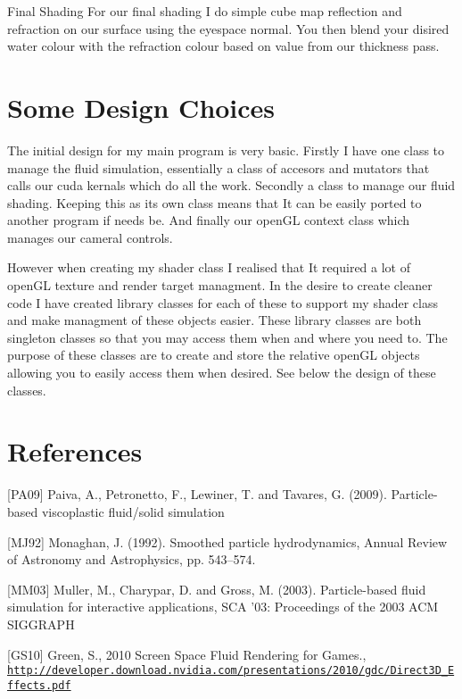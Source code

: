 \begin{DoxyEnumerate}
\item Final Shading For our final shading I do simple cube map reflection and refraction on our surface using the eyespace normal. You then blend your disired water colour with the refraction colour based on value from our thickness pass.\par
  
\end{DoxyEnumerate}

\section*{Some Design Choices }

The initial design for my main program is very basic. Firstly I have one class to manage the fluid simulation, essentially a class of accesors and mutators that calls our cuda kernals which do all the work. Secondly a class to manage our fluid shading. Keeping this as its own class means that It can be easily ported to another program if needs be. And finally our open\-G\-L context class which manages our cameral controls.\par
 However when creating my shader class I realised that It required a lot of open\-G\-L texture and render target managment. In the desire to create cleaner code I have created library classes for each of these to support my shader class and make managment of these objects easier. These library classes are both singleton classes so that you may access them when and where you need to. The purpose of these classes are to create and store the relative open\-G\-L objects allowing you to easily access them when desired. See below the design of these classes.\par


\section*{References }

\mbox{[}P\-A09\mbox{]} Paiva, A., Petronetto, F., Lewiner, T. and Tavares, G. (2009). Particle-\/based viscoplastic fluid/solid simulation\par
\mbox{[}M\-J92\mbox{]} Monaghan, J. (1992). Smoothed particle hydrodynamics, Annual Review of Astronomy and Astrophysics, pp. 543–574.\par
\mbox{[}M\-M03\mbox{]} Muller, M., Charypar, D. and Gross, M. (2003). Particle-\/based fluid simulation for interactive applications, S\-C\-A ’03\-: Proceedings of the 2003 A\-C\-M S\-I\-G\-G\-R\-A\-P\-H\par
\mbox{[}G\-S10\mbox{]} Green, S., 2010 Screen Space Fluid Rendering for Games., \href{http://developer.download.nvidia.com/presentations/2010/gdc/Direct3D_Effects.pdf}{\tt http\-://developer.\-download.\-nvidia.\-com/presentations/2010/gdc/\-Direct3\-D\-\_\-\-Effects.\-pdf}\par
